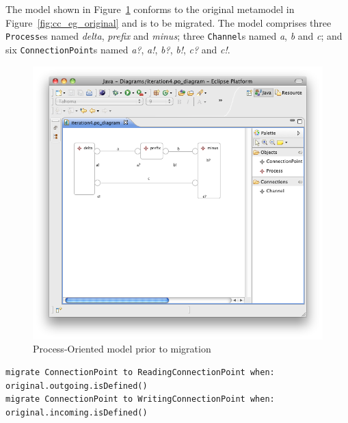 The model shown in Figure~\ref{fig:cc_eg_model} conforms to the original metamodel in Figure~\ref{fig:cc_eg_original} and is to be migrated. The model comprises three \texttt{Pr\-oc\-e\-ss}es named \emph{delta}, \emph{prefix} and \emph{minus}; three \texttt{Ch\-an\-n\-el}s named \emph{a}, \emph{b} and \emph{c}; and six \texttt{Co\-nn\-ec\-ti\-o\-nP\-oi\-nt}s named \emph{a?}, \emph{a!}, \emph{b?}, \emph{b!}, \emph{c?} and \emph{c!}.

\begin{figure}[htbp]
	\centering
		\includegraphics[scale=0.5]{A.2.ProcessOriented/images/4_model.png}
	\caption{Process-Oriented model prior to migration}
	\label{fig:cc_eg_model}
\end{figure}

\begin{lstlisting}[float=tbp, caption=Redefining equivalences for the Component model migration., label=lst:cc_eg_rules, language=Flock]
migrate ConnectionPoint to ReadingConnectionPoint when: original.outgoing.isDefined()
migrate ConnectionPoint to WritingConnectionPoint when: original.incoming.isDefined()
\end{lstlisting}

